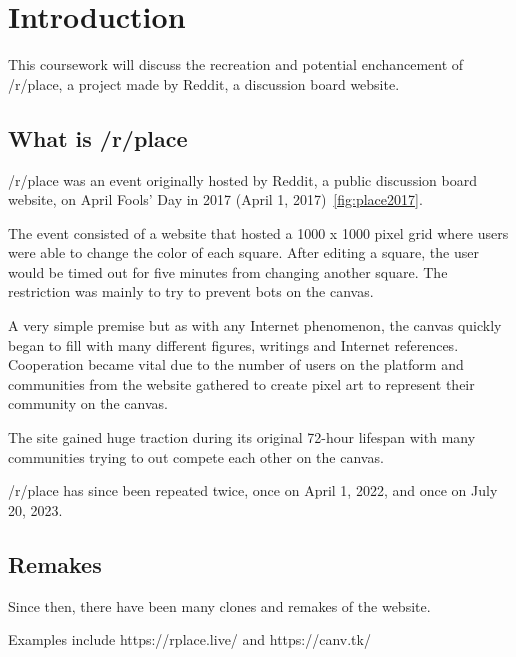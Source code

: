 

\section{Introduction}\label{sec:introduction}

This coursework will discuss the recreation and potential enchancement of /r/place, a project made by Reddit, a discussion board website.

\subsection{What is /r/place}\label{subsec:what-is-/r/place}

/r/place was an event originally hosted by Reddit, a public discussion board website, on April Fools' Day in 2017 (April 1, 2017)~\ref{fig:place2017}.

The event consisted of a website that hosted a 1000 x 1000 pixel grid where users were able to change the color of each square.
After editing a square, the user would be timed out for five minutes from changing another square.
The restriction was mainly to try to prevent bots on the canvas.

A very simple premise but as with any Internet phenomenon, the canvas quickly began to fill with many different figures, writings and Internet references.
Cooperation became vital due to the number of users on the platform and communities from the website gathered to create pixel art to represent their community on the canvas.

The site gained huge traction during its original 72-hour lifespan with many communities trying to out compete each other on the canvas.

/r/place has since been repeated twice, once on April 1, 2022, and once on July 20, 2023.

\subsection{Remakes}\label{subsec:remakes}

Since then, there have been many clones and remakes of the website.

Examples include https://rplace.live/ and https://canv.tk/